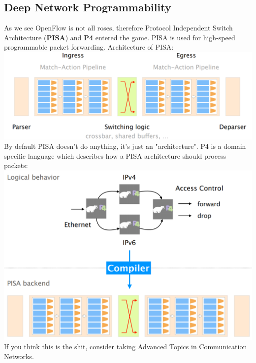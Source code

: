\documentclass[a4paper, fontsize=8pt, landscape, DIV=1]{scrartcl}
\begin{document}
\begin{multicols*}{4}
\begin{itemize}[noitemsep]
			\subsection{Deep Network Programmability}
			As we see OpenFlow is not all roses, therefore Protocol Independent Switch Architecture (\textbf{PISA}) and \textbf{P4} entered the game. PISA is used for high-speed programmable packet forwarding. Architecture of PISA:\\
			\includegraphics[width=\columnwidth]{images/Programmable_Networks/PISA.png}
			By default PISA doesn't do anything, it's just an "architecture". P4 is a domain specific language which describes how a PISA architecture should process packets:\\
			\includegraphics[width=\columnwidth]{images/Programmable_Networks/PISA_P4.png}
			If you think this is the shit, consider taking Advanced Topics in Communication Networks.
		\end{itemize}
		
	\end{multicols*}
	\setcounter{secnumdepth}{3}
\end{document}
